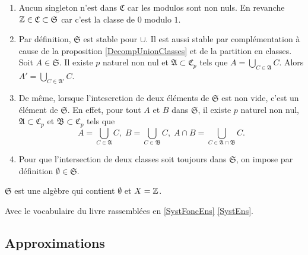 \begin{rems}
 \begin{enumerate}
  \item  Aucun singleton n'est dans $\mathfrak{C}$ car les modulos sont non nuls. En revanche $\mathbb{Z} \in \mathfrak{C} \subset \mathfrak{S}$ car c'est la classe de $0$ modulo $1$.

  \item Par définition, $\mathfrak{S}$ est stable pour $\cup$. Il est aussi stable par complémentation à cause de la proposition \ref{DecompUnionClasses} et de la partition en classes. Soit $A\in \mathfrak{S}$. Il existe $p$ naturel non nul et $\mathfrak{A}\subset \mathfrak{C}_p$ tels que $A = \bigcup_{C \in \mathfrak{A}} C$. Alors $A' = \bigcup_{C \in \mathfrak{A}'} C$.

  \item De même, lorsque l'inteserction de deux éléments de $\mathfrak{S}$ est non vide, c'est un élément de $\mathfrak{S}$. En effet, pour tout $A$ et $B$ dans $\mathfrak{S}$, il existe $p$ naturel non nul, $\mathfrak{A}\subset \mathfrak{C}_p$ et $\mathfrak{B}\subset \mathfrak{C}_p$ tels que
  \begin{displaymath}
   A = \bigcup_{C \in \mathfrak{A}} C, \; B = \bigcup_{C \in \mathfrak{B}} C, \; A\cap B = \bigcup_{C \in \mathfrak{A}\cap \mathfrak{B}} C.
  \end{displaymath}

  \item Pour que l'intersection de deux classes soit toujours dans $\mathfrak{S}$, on impose par définition $\emptyset \in \mathfrak{S}$.
\end{enumerate}
\end{rems}

\begin{prop}
  $\mathfrak{S}$ est une algèbre qui contient $\emptyset$ et $X=\mathbb{Z}$.
\end{prop}
\begin{demo}
 Avec le vocabulaire du livre rassemblées en \ref{SystFoncEns} \ref{SystEns}.
\end{demo}

\subsection{Approximations}\label{Approximations}\label{Expleppal}

